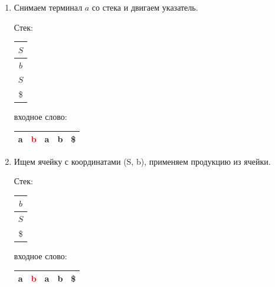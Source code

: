 \begin{example}
\begin{enumerate}
    \begin{center}
      \resizebox{1cm}{1cm}{
    
    }
  \end{center}

\item Снимаем терминал $a$ со стека и двигаем указатель.

    Стек: \,
    \begin{tabular}[c]{ |c| }
        \\ \hline
        $S$ \\ \hline
        $b$ \\ \hline
        $S$ \\ \hline
        \$ \\ \hline
    \end{tabular}
    \qquad  \qquad \qquad  \qquad входное слово: \,
    \begin{tabular}[c]{ |c|c|c|c|c| }
        \hline
        a & \textcolor{red}{b} & a & b & \$ \\ \hline
    \end{tabular}

    \begin{center}
      \resizebox{1.5cm}{1.3cm}{
    
    }
  \end{center}

\item Ищем ячейку с координатами (S, b), применяем продукцию из ячейки.

    Стек: \,
    \begin{tabular}[c]{ |c| }
        \\ \hline
        $b$ \\ \hline
        $S$ \\ \hline
        \$ \\ \hline
    \end{tabular}
    \qquad  \qquad \qquad  \qquad входное слово: \,
    \begin{tabular}[c]{ |c|c|c|c|c| }
        \hline
        a & \textcolor{red}{b} & a & b & \$ \\ \hline
    \end{tabular}

    \begin{center}
      \resizebox{3cm}{2cm}{
    
  }
\end{center}


\end{enumerate}
\end{example}
